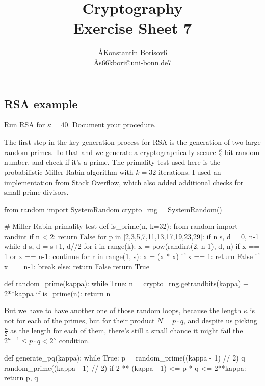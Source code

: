 \documentclass{article}
\title{Cryptography \\ Exercise Sheet 7}
\author{
  \AA{Konstantin Borisov}{6} \\
  \href{mailto:\AA{s66kbori@uni-bonn.de}{7}}{\AA{s66kbori@uni-bonn.de}{7}}
}
\begin{document}
  \maketitle

  \setcounter{section}{7}
  \subsection{RSA example}
  \begin{centerframebox}
    Run RSA for $\kappa = 40$. Document your procedure.
  \end{centerframebox}
  The first step in the key generation process for RSA is the generation of two large random primes.
  To that and we generate a cryptographically secure $\frac{\kappa}{2}$-bit random number,
  and check if it's a prime.
  The primality test used here is the probabilistic Miller-Rabin algorithm with $k=32$ iterations.
  I used an implementation from \href{https://stackoverflow.com/a/36525088}{Stack Overflow},
  which also added additional checks for small prime divisors.
  \begin{mylisting}
    from random import SystemRandom
    crypto_rng = SystemRandom()

    # Miller-Rabin primality test
    def is_prime(n, k=32):
        from random import randint
        if n < 2: return False
        for p in [2,3,5,7,11,13,17,19,23,29]:
            if n %
        s, d = 0, n-1
        while d %
            s, d = s+1, d//2
        for i in range(k):
            x = pow(randint(2, n-1), d, n)
            if x == 1 or x == n-1: continue
            for r in range(1, s):
                x = (x * x) %
                if x == 1: return False
                if x == n-1: break
            else: return False
        return True

    def random_prime(kappa):
        while True:
            n = crypto_rng.getrandbits(kappa) + 2**kappa
            if is_prime(n):
                return n
  \end{mylisting}

  But we have to have another one of those random loops, because the length $\kappa$ is not for each of the primes,
  but for their product $N = p\cdot q$, and despite us picking $\frac{\kappa}{2}$ as the length for each of them,
  there's still a small chance it might fail the $2^{\kappa-1} \leq p\cdot q < 2^\kappa$ condition.
  \begin{mylisting}
    def generate_pq(kappa):
        while True:
            p = random_prime((kappa - 1) // 2)
            q = random_prime((kappa - 1) // 2)
            if 2 ** (kappa - 1) <= p * q <= 2**kappa:
                return p, q
  \end{mylisting}
\end{document}

